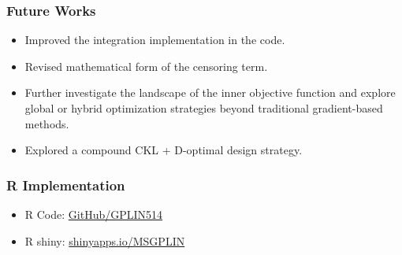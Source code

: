 \documentclass[xcolor=dvipsnames,aspectratio=1610]{beamer}
\begin{document}
\begin{frame}
\frametitle{Future Works}

\begin{itemize}
\item Improved the integration implementation in the code.

\item Revised mathematical form of the censoring term.

\item Further investigate the landscape of the inner objective function and explore global or hybrid optimization strategies beyond traditional gradient-based methods.

\item Explored a compound CKL + D-optimal design strategy.
\end{itemize}

\end{frame}


\begin{frame}
\frametitle{R Implementation}

\begin{itemize}
\item R Code: \href{https://github.com/GPLIN514/Master-Thesis-ALT-Model-Discrimination-Design/blob/main/Thesis-code/code/Appendix\%20B\%20example\%20code.R}{GitHub/GPLIN514}

\item R shiny: \href{https://msgplin.shinyapps.io/Model-Discrimination-Design/}{shinyapps.io/MSGPLIN}

\end{itemize}

\begin{figure}
\end{figure}

\end{frame}
\end{document}
